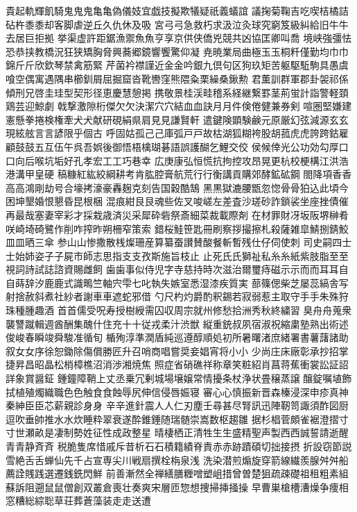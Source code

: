 貴起軌輝飢騎⻤⿁鬼⻲亀偽儀妓宜戯技擬欺犠疑祇義蟻誼
議掬菊鞠吉吃喫桔橘詰砧杵⿉黍却客脚虐逆丘久仇休及吸
宮⼸弓急救朽求汲泣灸球究窮笈級糾給旧⽜牛去居巨拒拠
挙渠虚許距鋸漁禦⿂魚亨享京供侠僑兇競共凶協匡卿叫喬
境峡強彊怯恐恭挟教橋況狂狭矯胸脅興蕎郷鏡響饗驚仰凝
尭暁業局曲極⽟玉桐粁僅勤均⼱巾錦⽄斤欣欽琴禁禽筋緊
芹菌衿襟謹近⾦金吟銀九倶句区狗玖矩苦躯駆駈駒具愚虞
喰空偶寓遇隅串櫛釧屑屈掘窟沓靴轡窪熊隈粂栗繰桑鍬勲
君薫訓群軍郡卦袈祁係傾刑兄啓圭珪型契形径恵慶慧憩掲
携敬景桂渓畦稽系経継繋罫茎荊蛍計詣警軽頚鶏芸迎鯨劇
戟撃激隙桁傑⽋欠決潔⽳穴結⾎血訣⽉月件倹倦健兼券剣
喧圏堅嫌建憲懸拳捲検権牽⽝犬献研硯絹県肩⾒見謙賢軒
遣鍵険顕験鹸元原厳幻弦減源⽞玄現絃舷⾔言諺限乎個古
呼固姑孤⼰己庫弧⼾戸故枯湖狐糊袴股胡菰⻁虎誇跨鈷雇
顧⿎鼓五互伍午呉吾娯後御悟梧檎瑚碁語誤護醐乞鯉交佼
侯候倖光公功効勾厚⼝口向后喉坑垢好孔孝宏⼯工巧巷幸
広庚康弘恒慌抗拘控攻昂晃更杭校梗構江洪浩港溝甲皇硬
稿糠紅紘絞綱耕考肯肱腔膏航荒⾏行衡講貢購郊酵鉱砿鋼
閤降項⾹香⾼高鴻剛劫号合壕拷濠豪轟麹克刻告国穀酷鵠
⿊黒獄漉腰甑忽惚⾻骨狛込此頃今困坤墾婚恨懇昏昆根梱
混痕紺⾉艮魂些佐叉唆嵯左差査沙瑳砂詐鎖裟坐座挫債催
再最哉塞妻宰彩才採栽歳済災采犀砕砦祭斎細菜裁載際剤
在材罪財冴坂阪堺榊肴咲崎埼碕鷺作削咋搾昨朔柵窄策索
錯桜鮭笹匙冊刷察拶撮擦札殺薩雑皐鯖捌錆鮫⽫皿晒三傘
参⼭山惨撒散桟燦珊産算纂蚕讃賛酸餐斬暫残仕仔伺使刺
司史嗣四⼠士始姉姿⼦子屍市師志思指⽀支孜斯施旨枝⽌
止死⽒氏獅祉私⽷糸紙紫肢脂⾄至視詞詩試誌諮資賜雌飼
⻭歯事似侍児字寺慈持時次滋治爾璽痔磁⽰示⽽而⽿耳⾃
自蒔辞汐⿅鹿式識鴫竺軸宍雫七叱執失嫉室悉湿漆疾質実
蔀篠偲柴芝屡蕊縞舎写射捨赦斜煮社紗者謝⾞車遮蛇邪借
勺尺杓灼爵酌釈錫若寂弱惹主取守⼿手朱殊狩珠種腫趣酒
⾸首儒受呪寿授樹綬需囚収周宗就州修愁拾洲秀秋終繍習
臭⾈舟蒐衆襲讐蹴輯週酋酬集醜什住充⼗十従戎柔汁渋獣
縦重銃叔夙宿淑祝縮粛塾熟出術述俊峻春瞬竣舜駿准循旬
楯殉淳準潤盾純巡遵醇順処初所暑曙渚庶緒署書薯藷諸助
叙⼥女序徐恕鋤除傷償勝匠升召哨商唱嘗奨妾娼宵将⼩小
少尚庄床廠彰承抄招掌捷昇昌昭晶松梢樟樵沼消渉湘焼焦
照症省硝礁祥称章笑粧紹肖菖蒋蕉衝裳訟証詔詳象賞醤鉦
鍾鐘障鞘上丈丞乗冗剰城場壌嬢常情擾条杖浄状畳穣蒸譲
醸錠嘱埴飾拭植殖燭織職⾊色触⾷食蝕辱尻伸信侵唇娠寝
審⼼心慎振新晋森榛浸深申疹真神秦紳⾂臣芯薪親診⾝身
⾟辛進針震⼈人仁刃塵壬尋甚尽腎訊迅陣靭笥諏須酢図厨
逗吹垂帥推⽔水炊睡粋翠衰遂酔錐錘随瑞髄崇嵩数枢趨雛
据杉椙菅頗雀裾澄摺⼨寸世瀬畝是凄制勢姓征性成政整星
晴棲栖正清牲⽣生盛精聖声製⻄西誠誓請逝醒⻘青静⻫斉
税脆隻席惜戚斥昔析⽯石積籍績脊責⾚赤跡蹟碩切拙接摂
折設窃節説雪絶⾆舌蝉仙先千占宣専尖川戦扇撰栓栴泉浅
洗染潜煎煽旋穿箭線繊羨腺⾇舛船薦詮賎践選遷銭銑閃鮮
前善漸然全禅繕膳糎噌塑岨措曾曽楚狙疏疎礎祖租粗素組
蘇訴阻遡⿏鼠僧創双叢倉喪壮奏爽宋層匝惣想捜掃挿掻操
早曹巣槍槽漕燥争痩相窓糟総綜聡草荘葬蒼藻装⾛走送遭

